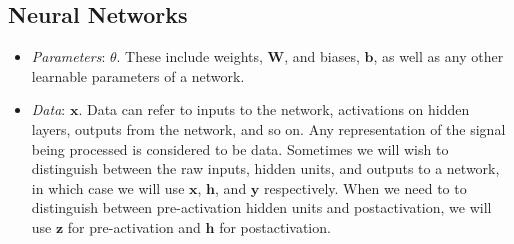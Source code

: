 \subsection*{Neural Networks}
\begin{itemize}
\item \textit{Parameters}: $\theta$. These include weights, $\mathbf{W}$, and biases, $\mathbf{b}$, as well as any other learnable parameters of a network.
\item \textit{Data}: $\mathbf{x}$. Data can refer to inputs to the network, activations on hidden layers, outputs from the network, and so on. Any representation of the signal being processed is considered to be data. Sometimes we will wish to distinguish between the raw inputs, hidden units, and outputs to a network, in which case we will use $\mathbf{x}$, $\mathbf{h}$, and $\mathbf{y}$ respectively. When we need to to distinguish between pre-activation hidden units and postactivation, we will use $\mathbf{z}$ for pre-activation and $\mathbf{h}$ for postactivation.


\end{itemize}
